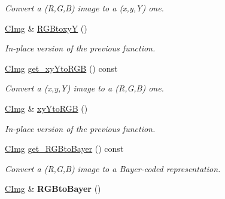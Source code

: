 \begin{DoxyCompactItemize}
\begin{DoxyCompactList}\small\item\em Convert a (R,G,B) image to a (x,y,Y) one. \end{DoxyCompactList}\item 
\hypertarget{structcimg__library_1_1_c_img_a7d7b0cca8ec1e075fa5f1ef4c63ad938}{\hyperlink{structcimg__library_1_1_c_img}{C\-Img} \& \hyperlink{structcimg__library_1_1_c_img_a7d7b0cca8ec1e075fa5f1ef4c63ad938}{R\-G\-Btoxy\-Y} ()}\label{structcimg__library_1_1_c_img_a7d7b0cca8ec1e075fa5f1ef4c63ad938}

\begin{DoxyCompactList}\small\item\em In-\/place version of the previous function. \end{DoxyCompactList}\item 
\hypertarget{structcimg__library_1_1_c_img_a3f3c8eb02552cb04611f8b583dd25608}{\hyperlink{structcimg__library_1_1_c_img}{C\-Img} \hyperlink{structcimg__library_1_1_c_img_a3f3c8eb02552cb04611f8b583dd25608}{get\-\_\-xy\-Yto\-R\-G\-B} () const }\label{structcimg__library_1_1_c_img_a3f3c8eb02552cb04611f8b583dd25608}

\begin{DoxyCompactList}\small\item\em Convert a (x,y,Y) image to a (R,G,B) one. \end{DoxyCompactList}\item 
\hypertarget{structcimg__library_1_1_c_img_a036e30fe130f8df62ea560d3a0ccd1fa}{\hyperlink{structcimg__library_1_1_c_img}{C\-Img} \& \hyperlink{structcimg__library_1_1_c_img_a036e30fe130f8df62ea560d3a0ccd1fa}{xy\-Yto\-R\-G\-B} ()}\label{structcimg__library_1_1_c_img_a036e30fe130f8df62ea560d3a0ccd1fa}

\begin{DoxyCompactList}\small\item\em In-\/place version of the previous function. \end{DoxyCompactList}\item 
\hyperlink{structcimg__library_1_1_c_img}{C\-Img} \hyperlink{structcimg__library_1_1_c_img_ab34cbfa4cf4062a42e027de3e94d9878}{get\-\_\-\-R\-G\-Bto\-Bayer} () const 
\begin{DoxyCompactList}\small\item\em Convert a (R,G,B) image to a Bayer-\/coded representation. \end{DoxyCompactList}\item 
\hypertarget{structcimg__library_1_1_c_img_a2a252e1ed5458253964b238b2647c705}{\hyperlink{structcimg__library_1_1_c_img}{C\-Img} \& {\bfseries R\-G\-Bto\-Bayer} ()}\label{structcimg__library_1_1_c_img_a2a252e1ed5458253964b238b2647c705}


\end{DoxyCompactItemize}
